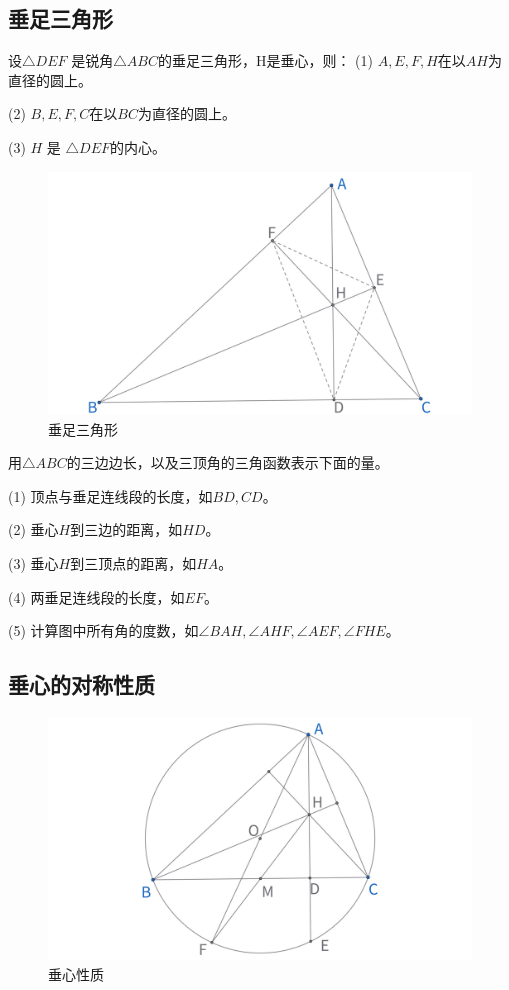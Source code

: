 \newpage
\subsection{垂足三角形}
\begin{proposition}[垂足三角形]
    设$\triangle DEF$ 是锐角$\triangle ABC$的垂足三角形，H是垂心，则：
    (1) $A, E, F, H$在以$AH$为直径的圆上。

    (2) $B, E, F, C$在以$BC$为直径的圆上。

    (3) $H$ 是 $\triangle DEF$的内心。
\end{proposition}
\begin{figure}[H]
    \centering
    \includegraphics[width=0.8\linewidth]{figures/三角形五心/垂足三角形.png}
    \caption{垂足三角形}
\end{figure}

\begin{exercise}
    用$\triangle ABC$的三边边长，以及三顶角的三角函数表示下面的量。

    (1) 顶点与垂足连线段的长度，如$BD, CD$。

    (2) 垂心$H$到三边的距离，如$HD$。

    (3) 垂心$H$到三顶点的距离，如$HA$。

    (4) 两垂足连线段的长度，如$EF$。

    (5) 计算图中所有角的度数，如$\angle BAH, \angle AHF, \angle AEF, \angle FHE$。  
\end{exercise}




\newpage 
\subsection{垂心的对称性质}
\begin{figure}[H]
    \centering
    \includegraphics[width=0.8\linewidth]{figures/三角形五心/垂心的对称性质.png}
    \caption{垂心性质}
\end{figure}

